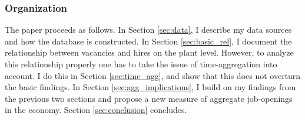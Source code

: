 \subsubsection{Organization}

The paper proceeds as follows. In Section \ref{sec:data}, I describe my data sources and how the database is constructed. In Section \ref{sec:basic_rel}, I document the relationship between vacancies and hires on the plant level. However, to analyze this relationship properly one has to take the issue of time-aggregation into account. I do this in Section \ref{sec:time_agg}, and show that this does not overturn the basic findings. In Section \ref{sec:agg_implications}, I build on my findings from the previous two sections and propose a new measure of aggregate job-openings in the economy. Section \ref{sec:conclusion} concludes.